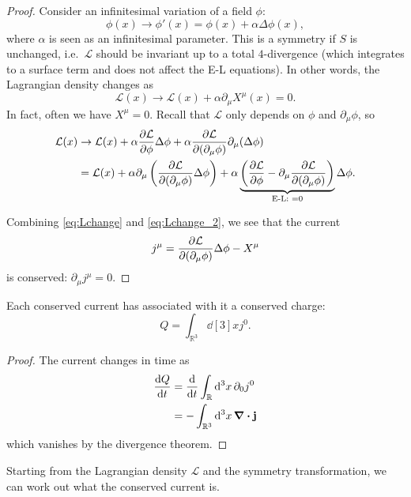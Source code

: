 \begin{proof}

  Consider an infinitesimal variation of a field $\phi$:
  \begin{equation}
    \phi(x) \to \phi'(x) = \phi(x) + \alpha \Delta \phi(x),
  \end{equation} 
  where $\alpha$ is seen as an infinitesimal parameter.
  This is a symmetry if $S$ is unchanged, i.e.~$\mathcal{L}$ should be invariant up to a total $4$-divergence (which integrates to a surface term and does not affect the E-L equations).
  In other words, the Lagrangian density changes as
  \begin{equation}
    \label{eq:Lchange}
    \mathcal{L}(x) \to \mathcal{L}(x) + \alpha \partial_\mu X^\mu(x) = 0.
  \end{equation}
  In fact, often we have $X^\mu = 0$.
  Recall that $\mathcal{L}$ only depends on $\phi$ and $\partial_\mu \phi$, so
  \begin{align}
    \mathcal{L}(x) &\to \mathcal{L}(x) + \alpha \pdv{\mathcal{L}}{\phi} \Delta \phi + \alpha \pdv{\mathcal{L}}{(\partial_\mu \phi)} \partial_\mu(\Delta \phi) \\
    \label{eq:Lchange_2}
    &= \mathcal{L}(x) + \alpha \partial_\mu \left( \pdv{\mathcal{L}}{(\partial_\mu \phi)} \Delta \phi \right) + \alpha \underbrace{\left( \pdv{\mathcal{L}}{\phi} - \partial_\mu \pdv{\mathcal{L}}{(\partial_\mu \phi)} \right)}_{\text{E-L: } = 0} \Delta \phi.
  \end{align}

  Combining \eqref{eq:Lchange} and \eqref{eq:Lchange_2}, we see that the current
  \begin{equation}
    j^\mu = \pdv{\mathcal{L}}{(\partial_\mu \phi)} \Delta \phi - X^\mu
  \end{equation}
  is conserved: $\partial_\mu j^\mu = 0$.
\end{proof}
\begin{leftbar}
  \begin{remark}
    Each conserved current has associated with it a conserved charge:
    \begin{equation}
      Q = \int_{\mathbb{R}^3}^{} \dd[3]{x} j^0.
    \end{equation}
    \begin{proof}
      The current changes in time as
      \begin{align}
	\dv{Q}{t} &= \dv{}{t} \int_{\mathbb{R}}^{} \dd[3]{x} \partial_0 j^0 \\
	&= - \int_{\mathbb{R}^3}^{} \dd[3]{x} \div \vb{j}
      \end{align}
      which vanishes by the divergence theorem.
    \end{proof}
    Starting from the Lagrangian density $\mathcal{L}$ and the symmetry transformation, we can work out what the conserved current is.
  \end{remark}
\end{leftbar}

